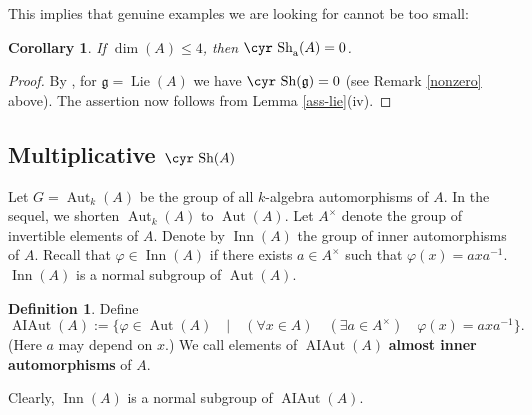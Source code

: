 \documentclass[11pt,reqno]{amsart}
\numberwithin{equation}{section}
\newtheorem{cor}[theorem]{Corollary}
\theoremstyle{definition}
\newtheorem{definition}[theorem]{Definition}
\newcommand{\Aut}{{\operatorname{ Aut}}}
\newcommand{\Inner}{{\operatorname{ Inn}}}
\newcommand{\AIAut}{{\operatorname{ AIAut}}}
\newcommand{\Lie}{{\operatorname{ Lie}}}
\def\Sha{\text{\cyr Sh}}
\def\g{\mathfrak g}
\begin{document}
This implies that genuine examples we are looking for cannot be too small:

\begin{cor}
If $\dim (A)\le 4$, then $\Sha_{\text{\rm{a}}}(A)=0$.
\end{cor}

\begin{proof}
By \cite[Proposition~2.8]{BDV1}, for $\g =\Lie(A)$ we have $\Sha (\g)=0$
(see Remark \ref{nonzero} above).
The assertion now follows from Lemma \ref{ass-lie}(iv).
\end{proof}




\subsection{Multiplicative $\Sha (A)$} \label{subsec:mult}

Let $G=\Aut_k(A)$ be the group of all $k$-algebra automorphisms of $A$. In the sequel,
we shorten $\Aut_k(A)$ to $\Aut(A)$. Let $A^{\times}$ denote
the group of invertible elements of $A$. Denote by
$\Inner (A)$ the group of inner automorphisms of $A$. Recall that
$\varphi\in \Inner (A)$ if there exists $a\in A^{\times}$ such that
$\varphi(x)=axa^{-1}$. $\Inner (A)$ is a normal subgroup of $\Aut (A)$.

\begin{definition}
Define
$$
\AIAut(A):=\{\varphi\in\Aut (A) \quad | \quad (\forall x\in A) \quad  (\exists a\in A^{\times}) \quad \varphi(x)=axa^{-1}\}.
$$
(Here $a$ may depend on $x$.) We call elements of $\AIAut (A)$ {\bf{almost inner automorphisms}} of $A$.
\end{definition}

Clearly, $\Inner (A)$ is a normal subgroup of $\AIAut (A)$.
\end{document}
